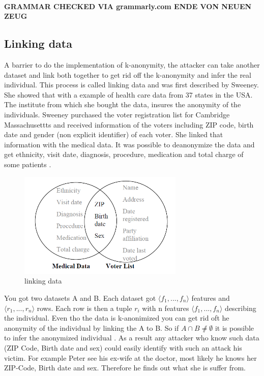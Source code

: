 \documentclass{llncs}
\begin{document}
\paragraph{GRAMMAR CHECKED VIA grammarly.com ENDE VON NEUEN ZEUG}

\subsection{Linking data}
A barrier to do the implementation of k-anonymity, the attacker can take another dataset and link both together to get rid off the k-anonymity and infer the real individual. This process is called linking data and was first described by Sweeney\cite{sweeney2002k}. She showed that with a example of health care data from 37 states in the USA. The institute from which she bought the data, insures the anonymity of the individuals. Sweeney purchased the voter registration list for Cambridge Massachusettts and received information of the voters including ZIP code, birth date and gender (non explicit identifier) of each voter. She linked that information with the medical data. It was possible to deanonymize the data  and get ethnicity, visit date, diagnosis, procedure, medication and total charge of some patients \cite{sweeney2002k}. 

\begin{figure}[]
	\centering
	\includegraphics[width=0.7\textwidth]{linkingdata.png}
	\caption{linking data}%
	\label{quasiidentifier}
\end{figure}
You got two datasets A and B. Each dataset got \ensuremath{\langle f_1, ... ,f_n \rangle} features and \ensuremath{\langle r_1, ... ,r_n \rangle} rows.
Each row is then a tuple \ensuremath{r_i} with n features \ensuremath{\langle f_1, ... ,f_n \rangle} describing the individual.
Even tho the data is k-anonimized you can get rid oft he anonymity of the individual by linking the A to B. So if \ensuremath{A \cap B \not \neq \emptyset} it is possible to infer the anonymized individual \cite{sweeney2002k}.
As a result any attacker who know such data (ZIP Code, Birth date and sex) could easily identify with such an attack his victim. For example Peter see his ex-wife at the doctor, most likely he knows her ZIP-Code, Birth date and sex. Therefore he finds out what she is suffer from. 
\end{document}
